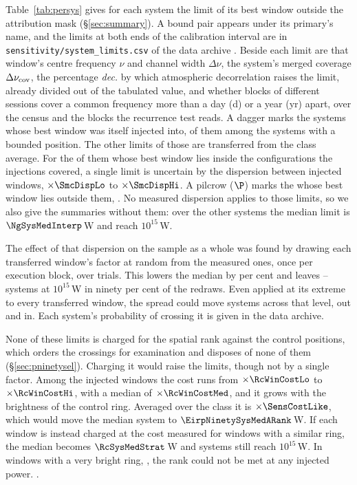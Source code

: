 Table~\ref{tab:persys} gives for each system the limit of its best window
outside the attribution mask (\S\ref{sec:summary}). A bound pair appears
under its primary's name, and the limits at both ends of the calibration
interval are in \texttt{sensitivity/\allowbreak system\_limits.csv} of the
data archive \citep{SIdeposit}. Beside each limit are that window's centre
frequency $\nu$ and channel width $\Delta\nu$, the system's merged coverage
$\Delta\nu_{\rm cov}$, the percentage \emph{dec.} by which atmospheric
decorrelation raises the limit, already divided out of the tabulated value,
and whether blocks of different
sessions cover a common frequency more than a day (d) or a year (yr) apart,
over the census and the \ZcNRecEB{} blocks the recurrence test reads. A
dagger marks the \SmcNMeasSys{} systems whose best window was itself injected
into, \SmcNMeasSysBnd{} of them among the \NSysALimSum{} systems with a bounded
position. The other \SmcNEstSysBnd{} limits of those \NSysALimSum{} are transferred
from the class average. For the \NgNInterpEstSysBnd{} of them whose best window
lies inside the configurations the injections covered, a single limit is
uncertain by the dispersion between injected windows, $\times\SmcDispLo$ to
$\times\SmcDispHi$. A pilcrow ($\P$) marks the \NgNExtrapSys{}
\NgExtrapSysNoun{} whose best window lies outside them, \NgExtrapSys. No
measured dispersion applies to those limits, so we also give the summaries
without them: over the other \NgNSysInterpSum{} systems the median limit is
$\NgSysMedInterp$\,W and \NgNSysEfifteenInterp{} reach $10^{15}$\,W.

The effect of that dispersion on the sample as a whole was found by drawing
each transferred window's factor at random from the measured ones, once per
execution block, over \SvNTrial{} trials. This lowers the median by
\SvRsMedShiftPct{} per cent and leaves \SvRsBlkNLo--\SvRsBlkNHi{} systems at
$10^{15}$\,W in ninety per cent of the redraws. Even applied at its extreme to every
transferred window, the spread could move \SvSprN{} systems across that
level, \SvSprNOut{} out and \SvSprNIn{} in. Each system's probability of
crossing it is given in the data archive.

None of these limits is charged for the spatial rank against the \NCtrl{}
control positions, which orders the crossings for examination and disposes
of none of them (\S\ref{sec:pninetysel}). Charging it would raise the
limits, though not by a single factor. Among the injected windows the cost
runs from $\times\RcWinCostLo$ to $\times\RcWinCostHi$, with a median of
$\times\RcWinCostMed$, and it grows with the brightness of the control ring.
Averaged over the class it is $\times\SensCostLike$, which would move the
median system to $\EirpNinetySysMedARank$\,W. If each window is instead
charged at the cost measured for windows with a similar ring, the median
becomes $\RcSysMedStrat$\,W and \RcNSysEfifteenStrat{} systems still reach
$10^{15}$\,W. In \SensNRingHiUnres{} windows with a very bright ring,
\RcNoRankWins, the rank could not be met at any injected power.
\RcNoRankSysClause.

